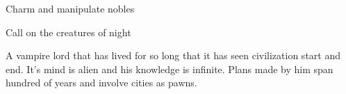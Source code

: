 {
\item Charm and manipulate nobles
\item Call on the creatures of night
}
{
	A vampire lord that has lived for so long that it has seen civilization start and end. It's mind is alien and his knowledge is infinite. Plans made by him span hundred of years and involve cities as pawns.
}